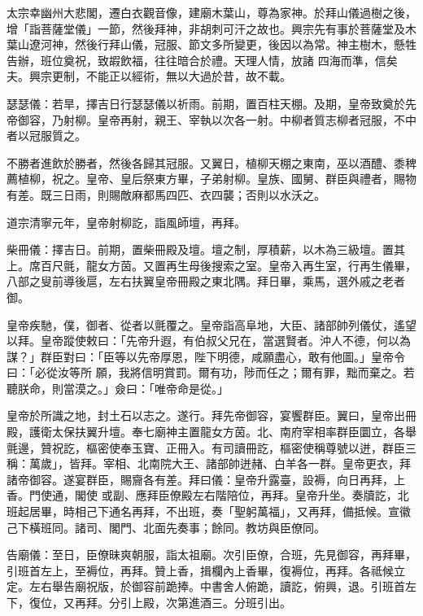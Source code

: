 \begin{pinyinscope}
 太宗幸幽州大悲閣，遷白衣觀音像，建廟木葉山，尊為家神。於拜山儀過樹之後，增「詣菩薩堂儀」一節，然後拜神，非胡刺可汗之故也。興宗先有事於菩薩堂及木葉山遼河神，然後行拜山儀，冠服、節文多所變更，後因以為常。神主樹木，懸牲告辦，班位奠祝，致嘏飲福，往往暗合於禮。天理人情，放諸
 四海而準，信矣夫。興宗更制，不能正以經術，無以大過於昔，故不載。



 瑟瑟儀：若旱，擇吉日行瑟瑟儀以祈雨。前期，置百柱天棚。及期，皇帝致奠於先帝御容，乃射柳。皇帝再射，親王、宰執以次各一射。中柳者質志柳者冠服，不中者以冠服質之。



 不勝者進飲於勝者，然後各歸其冠服。又翼日，植柳天棚之東南，巫以酒醴、黍稗薦植柳，祝之。皇帝、皇后祭東方畢，子弟射柳。皇族、國舅、群臣與禮者，賜物有差。既三日雨，則賜敵麻都馬四匹、衣四襲；否則以水沃之。



 道宗清寧元年，皇帝射柳訖，詣風師壇，再拜。



 柴冊儀：擇吉日。前期，置柴冊殿及壇。壇之制，厚積薪，以木為三級壇。置其上。席百尺氈，龍女方茵。又置再生母後搜索之室。皇帝入再生室，行再生儀畢，八部之叟前導後扈，左右扶翼皇帝冊殿之東北隅。拜日畢，乘馬，選外戚之老者御。



 皇帝疾馳，僕，御者、從者以氈覆之。皇帝詣高阜地，大臣、諸部帥列儀仗，遙望以拜。皇帝蹤使敕曰：「先帝升遐，有伯叔父兄在，當選賢者。沖人不德，何以為謀？」群臣對曰：「臣等以先帝厚恩，陛下明德，咸願盡心，敢有他圖。」皇帝令曰：「必從汝等所
 願，我將信明賞罰。爾有功，陟而任之；爾有罪，黜而棄之。若聽朕命，則當漠之。」僉曰：「唯帝命是從。」



 皇帝於所識之地，封土石以志之。遂行。拜先帝御容，宴饗群臣。翼曰，皇帝出冊殿，護衛太保扶翼升壇。奉七廟神主置龍女方茵。北、南府宰相率群臣圜立，各舉氈邊，贊祝訖，樞密使奉玉寶、正冊入。有司讀冊訖，樞密使稱尊號以迸，群臣三稱：萬歲」，皆拜。宰相、北南院大王、諸部帥迸赭、白羊各一群。皇帝更衣，拜諸帝御容。遂宴群臣，賜齎各有差。拜曰儀：皇帝升露臺，設褥，向日再拜，上香。門使通，閣使
 或副、應拜臣僚殿左右階陪位，再拜。皇帝升坐。奏牘訖，北班起居畢，時相己下通名再拜，不出班，奏「聖躬萬福」，又再拜，備抵候。宣徽己下橫班同。諸司、閣門、北面先奏事；餘同。教坊與臣僚同。



 告廟儀：至日，臣僚昧爽朝服，詣太祖廟。次引臣僚，合班，先見御容，再拜畢，引班首左上，至褥位，再拜。贊上香，揖欄內上香畢，復褥位，再拜。各祗候立定。左右舉告廟祝版，於御容前跪捧。中書舍人俯跪，讀訖，俯興，退。引班首左下，復位，又再拜。分引上殿，次第進酒三。分班引出。




\end{pinyinscope}

